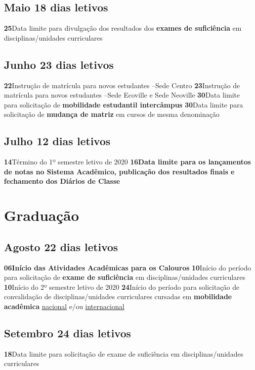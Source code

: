 \documentclass[thesis]{hmcposter}
\begin{document}
\begin{poster}
\subsection{Maio \hfill 18 dias letivos}\textbf{25}\qquad Data limite para divulgação dos resultados dos \textbf{exames de suficiência} em disciplinas/unidades curriculares \subsection{Junho \hfill 23 dias letivos}\textbf{22}\qquad Instrução de matrícula para novos estudantes –Sede Centro
 \newline\textbf{23}\qquad Instrução de matrícula para novos estudantes –Sede Ecoville e Sede Neoville
 \newline\textbf{30}\qquad Data limite para solicitação de \textbf{mobilidade estudantil intercâmpus} \newline\textbf{30}\qquad Data limite para solicitação de \textbf{mudança de matriz} em cursos de mesma denominação \subsection{Julho \hfill 12 dias letivos}\textbf{14}\qquad Término do 1º semestre letivo de 2020 \newline\textbf{16}\qquad \textbf{Data limite para os lançamentos de notas no Sistema Acadêmico, publicação dos resultados finais e fechamento dos Diários de Classe} \newpage
\section{\color{hmcorange}Graduação}\subsection{Agosto \hfill 22 dias letivos}\textbf{06}\qquad \textbf{Início das Atividades Acadêmicas para os Calouros} \newline\textbf{10}\qquad Início do período para solicitação de \textbf{exame de suficiência} em disciplinas/unidades curriculares \newline\textbf{10}\qquad Início do 2º semestre letivo de 2020 \newline\textbf{24}\qquad Início do período para solicitação de convalidação de disciplinas/unidades curriculares cursadas em \textbf{mobilidade acadêmica} \underline{nacional} e/ou \underline{internacional} \subsection{Setembro \hfill 24 dias letivos}\textbf{18}\qquad Data limite para solicitação de exame de suficiência em disciplinas/unidades curriculares

\end{poster}
\end{document}
